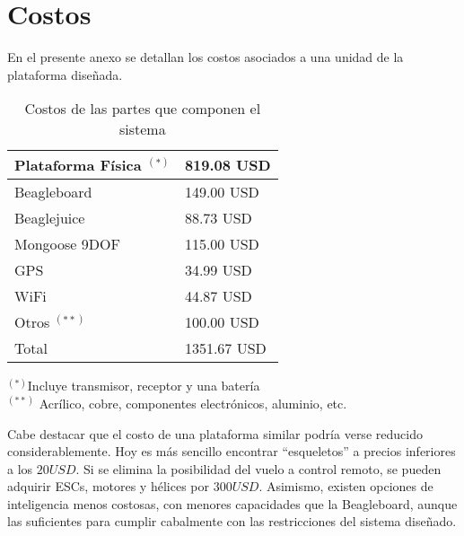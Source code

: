 \documentclass[main]{subfiles}
\begin{document}
\chapter{Costos}
\label{chap:anexo_costos}
En el presente anexo se detallan los costos asociados a una unidad de la plataforma dise\~nada. 

\begin{table}[H]
\begin{center}
\begin{tabular}{|p{5cm}|p{3cm}|}
\hline
Plataforma F\'isica $^{(*)}$  & 819.08 USD  \\
\hline
Beagleboard & 149.00 USD \\
\hline
Beaglejuice & 88.73 USD\\
\hline 
Mongoose 9DOF & 115.00 USD\\
\hline
GPS & 34.99 USD\\
\hline
WiFi & 44.87 USD\\
\hline
Otros $^{(**)}$ & 100.00 USD\\
\hline
Total & 1351.67 USD \\
\hline
\end{tabular}
\label{tab:acc-anexo}
\end{center}
\begin{center}
$^{(*)}$Incluye transmisor, receptor y una bater\'ia\\
$^{(**)}$ Acr\'ilico, cobre, componentes electr\'onicos, aluminio, etc.
\end{center}
\caption{Costos de las partes que componen el sistema}
\end{table}

Cabe destacar que el costo de una plataforma similar podr\'ia verse reducido considerablemente. Hoy es m\'as sencillo encontrar ``esqueletos'' a precios inferiores a los $20USD$. Si se elimina la posibilidad del vuelo a control remoto, se pueden adquirir ESCs, motores y h\'elices por $300 USD$. Asimismo, existen opciones de inteligencia menos costosas, con menores capacidades que la Beagleboard, aunque las suficientes para cumplir cabalmente con las restricciones del sistema dise\~nado. 
\end{document}
